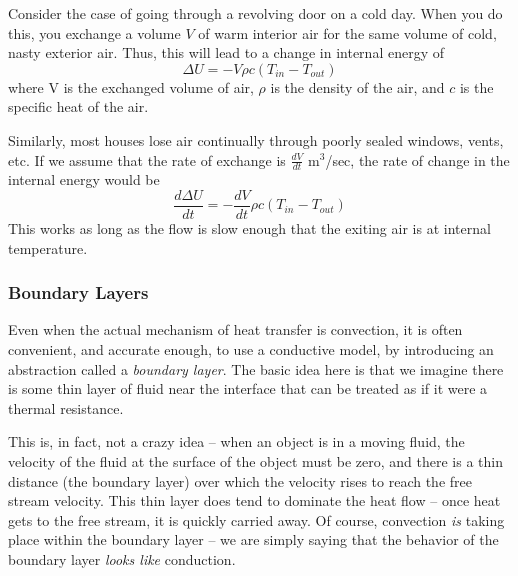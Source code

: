 \documentclass[10pt]{book}
\begin{document}
Consider the case of going through a revolving door on a cold day.  When you do this, you exchange a volume $V$ of warm interior air for the same volume of cold, nasty exterior air.  Thus, this will lead to a change in internal energy of
$$ \Delta U = - V\rho c (T_{in} - T_{out})$$
where V is the exchanged volume of air, $\rho$ is the density of the air, and $c$ is the specific heat of the air.

Similarly, most houses lose air continually through poorly sealed windows, vents, etc.  If we assume that the rate of exchange is $\frac{dV}{dt}$ m$^3$/sec, the rate of change in the internal energy would be 
$$\frac{d\Delta U}{dt} = - \frac{dV}{dt} \rho c (T_{in} - T_{out})$$
This works as long as the flow is slow enough that the exiting air is at internal temperature.

\subsubsection{Boundary Layers}

Even when the actual mechanism of heat transfer is convection, it is often convenient, and accurate enough, to use a conductive model, by introducing an abstraction called a {\it boundary layer}. The basic idea here is that we imagine there is some thin layer of fluid near the interface that can be treated as if it were a thermal resistance.  

This is, in fact, not a crazy idea -- when an object is in a moving fluid, the velocity of the fluid at the surface of the object must be zero, and there is a thin distance (the boundary layer) over which the velocity rises to reach the free stream velocity.  This thin layer does tend to dominate the heat flow -- once heat gets to the free stream, it is quickly carried away.  Of course, convection {\it is} taking place within the boundary layer -- we are simply saying that the behavior of the boundary layer {\it looks like} conduction.  
\end{document}
